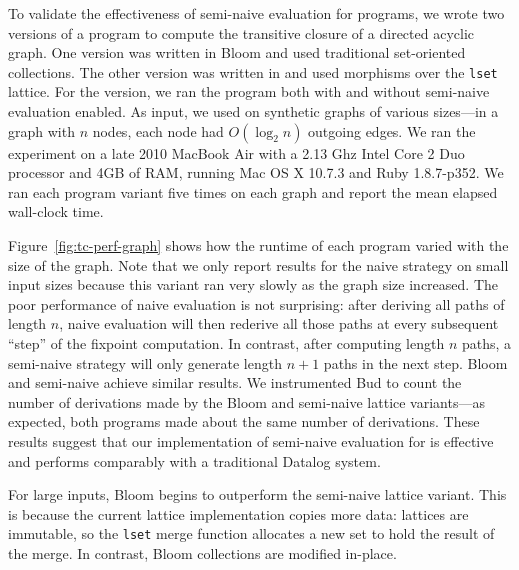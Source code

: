To validate the effectiveness of semi-naive evaluation for \lang programs, we
wrote two versions of a program to compute the transitive closure of a directed
acyclic graph. One version was written in Bloom and used traditional
set-oriented collections. The other version was written in \lang and used
morphisms over the \texttt{lset} lattice. For the \lang version, we ran the
program both with and without semi-naive evaluation enabled. As input, we used
on synthetic graphs of various sizes---in a graph with $n$ nodes, each node had
$O(\log_2 n)$ outgoing edges. We ran the experiment on a late 2010
MacBook Air with a 2.13 Ghz Intel Core 2 Duo processor and 4GB of RAM, running
Mac OS X 10.7.3 and Ruby 1.8.7-p352. We ran each program variant five times on
each graph and report the mean elapsed wall-clock time.

Figure~\ref{fig:tc-perf-graph} shows how the runtime of each program varied with
the size of the graph. Note that we only report results for the naive \lang
strategy on small input sizes because this variant ran very slowly as the graph
size increased. The poor performance of naive evaluation is not surprising:
after deriving all paths of length $n$, naive evaluation will then rederive all
those paths at every subsequent ``step'' of the fixpoint computation. In
contrast, after computing length $n$ paths, a semi-naive strategy will only
generate length $n+1$ paths in the next step. Bloom and semi-naive \lang achieve
similar results. We instrumented Bud to count the number of derivations made by
the Bloom and semi-naive lattice variants---as expected, both programs made about
the same number of derivations. These results suggest that our implementation of
semi-naive evaluation for \lang is effective and performs comparably with a
traditional Datalog system.

For large inputs, Bloom begins to outperform the semi-naive lattice variant. This
is because the current lattice implementation copies more data: lattices are
immutable, so the \texttt{lset} merge function allocates a new set to hold the
result of the merge. In contrast, Bloom collections are modified in-place.
